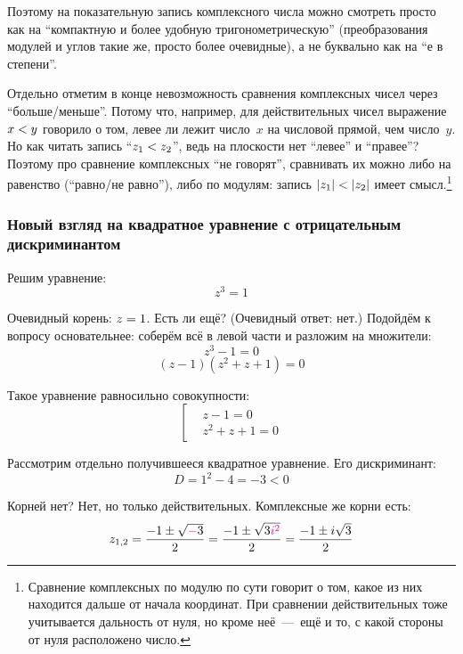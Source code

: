 \documentclass[a4paper,12pt]{article}
\begin{document}
  Поэтому на показательную запись комплексного числа можно смотреть просто как на ``компактную и более удобную тригонометрическую'' (преобразования модулей и углов такие же, просто более очевидные), а не буквально как на ``е в степени''.

  \medskip

  Отдельно отметим в конце невозможность сравнения комплексных чисел через ``больше/меньше''.
  Потому что, например, для действительных чисел выражение $x \hm< y$ говорило о том, левее ли лежит число~$x$ на числовой прямой, чем число~$y$.
  Но как читать запись ``$z_1 \hm< z_2$'', ведь на плоскости нет ``левее'' и ``правее''?
  Поэтому про сравнение комплексных ``не говорят'', сравнивать их можно либо на равенство (``равно/не равно''), либо по модулям: запись $|z_1| \hm< |z_2|$ имеет смысл.\footnote{
    Сравнение комплексных по модулю по сути говорит о том, какое из них находится дальше от начала координат.
    При сравнении действительных тоже учитывается дальность от нуля, но кроме неё~---~ещё и то, с какой стороны от нуля расположено число.
  }


  \subsubsection{Новый взгляд на квадратное уравнение с отрицательным дискриминантом}

  Решим уравнение:
  \begin{equation}\label{eq:cubic-for-quadratic}
    z^3 = 1
  \end{equation}

  Очевидный корень: $z \hm= 1$.
  Есть ли ещё?
  (Очевидный ответ: нет.)
  Подойдём к вопросу основательнее: соберём всё в левой части и разложим на множители:
  \[
    z^3 - 1 = 0
  \]
  \[
    (z - 1)(z^2 + z + 1) = 0
  \]

  Такое уравнение равносильно совокупности:
  \[
    \left[
      \begin{aligned}
          &z - 1 = 0\\
          &z^2 + z + 1 = 0
      \end{aligned}
    \right.
  \]

  Рассмотрим отдельно получившееся квадратное уравнение.
  Его дискриминант:
  \[
    D = 1^2 - 4 = -3 < 0
  \]

  Корней нет?
  Нет, но только действительных.
  Комплексные же корни есть:
  \[ %
    z_{1, 2} = \frac{-1 \pm \sqrt{\textcolor{pink}{-}3}}{2} = \frac{-1 \pm \sqrt{3\textcolor{pink}{i^2}}}{2} = \frac{-1 \pm i\sqrt{3}}{2}
  \]
\end{document}

